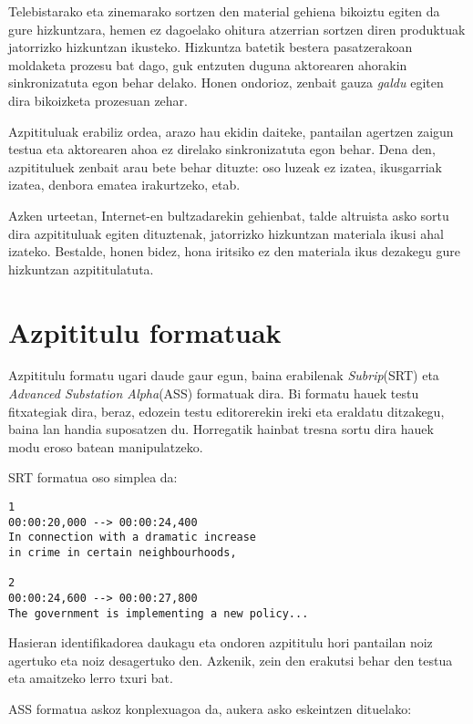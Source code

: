 Telebistarako eta zinemarako sortzen den material gehiena bikoiztu egiten da gure hizkuntzara, hemen ez dagoelako ohitura atzerrian sortzen diren produktuak jatorrizko hizkuntzan ikusteko. Hizkuntza batetik bestera pasatzerakoan moldaketa prozesu bat dago, guk entzuten duguna aktorearen ahorakin sinkronizatuta egon behar delako. Honen ondorioz, zenbait gauza \textit{galdu} egiten dira bikoizketa prozesuan zehar.

Azpitituluak erabiliz ordea, arazo hau ekidin daiteke, pantailan agertzen zaigun testua eta aktorearen ahoa ez direlako sinkronizatuta egon behar. Dena den, azpitituluek zenbait arau bete behar dituzte: oso luzeak ez izatea, ikusgarriak izatea, denbora ematea irakurtzeko, etab.

Azken urteetan, Internet-en bultzadarekin gehienbat, talde altruista asko sortu dira azpitituluak egiten dituztenak, jatorrizko hizkuntzan materiala ikusi ahal izateko. Bestalde, honen bidez, hona iritsiko ez den materiala ikus dezakegu gure hizkuntzan azpititulatuta.

\section{Azpititulu formatuak}
Azpititulu formatu ugari daude gaur egun, baina erabilenak \textit{Subrip}(SRT) eta \textit{Advanced Substation Alpha}(ASS) formatuak dira. Bi formatu hauek testu fitxategiak dira, beraz, edozein testu editorerekin ireki eta eraldatu ditzakegu, baina lan handia suposatzen du. Horregatik hainbat tresna sortu dira hauek modu eroso batean manipulatzeko.

SRT formatua oso simplea da:
\begin{verbatim}
1
00:00:20,000 --> 00:00:24,400
In connection with a dramatic increase
in crime in certain neighbourhoods,

2
00:00:24,600 --> 00:00:27,800
The government is implementing a new policy...
\end{verbatim}
Hasieran identifikadorea daukagu eta ondoren azpititulu hori pantailan noiz agertuko eta noiz desagertuko den. Azkenik, zein den erakutsi behar den testua eta amaitzeko lerro txuri bat.

ASS formatua askoz konplexuagoa da, aukera asko eskeintzen dituelako:


